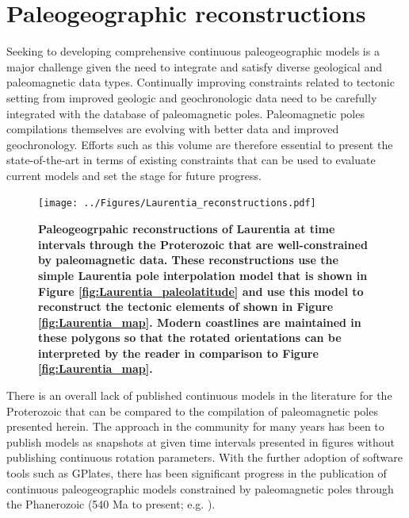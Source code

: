 \documentclass[11pt,letterpaper]{article}
\begin{document}
{\section*{Paleogeographic reconstructions}

Seeking to developing comprehensive continuous paleogeographic models is a major challenge given the need to integrate and satisfy diverse geological and paleomagnetic data types. Continually improving constraints related to tectonic setting from improved geologic and geochronologic data need to be carefully integrated with the database of paleomagnetic poles. Paleomagnetic poles compilations themselves are evolving with better data and improved geochronology. Efforts such as this volume are therefore essential to present the state-of-the-art in terms of existing constraints that can be used to evaluate current models and set the stage for future progress.

\begin{figure}
\centering
\texttt{[image: ../Figures/Laurentia\_reconstructions.pdf]}
\caption{\small{\textbf{Paleogeogrpahic reconstructions of Laurentia at time intervals through the Proterozoic that are well-constrained by paleomagnetic data. These reconstructions use the simple Laurentia pole interpolation model that is shown in Figure \ref{fig:Laurentia_paleolatitude} and use this model to reconstruct the tectonic elements of \cite{Whitmeyer2007a} shown in Figure \ref{fig:Laurentia_map}. Modern coastlines are maintained in these polygons so that the rotated orientations can be interpreted by the reader in comparison to Figure \ref{fig:Laurentia_map}.}}}
\label{fig:Laurentia_reconstructions}
\end{figure} 

 There is an overall lack of published continuous models in the literature for the Proterozoic that can be compared to the compilation of paleomagnetic poles presented herein. The approach in the community for many years has been to publish models as snapshots at given time intervals presented in figures without publishing continuous rotation parameters. With the further adoption of software tools such as GPlates, there has been significant progress in the publication of continuous paleogeographic models constrained by paleomagnetic poles through the Phanerozoic (540 Ma to present; e.g. \citealp{Torsvik2012a}).
 
}
\end{document}
